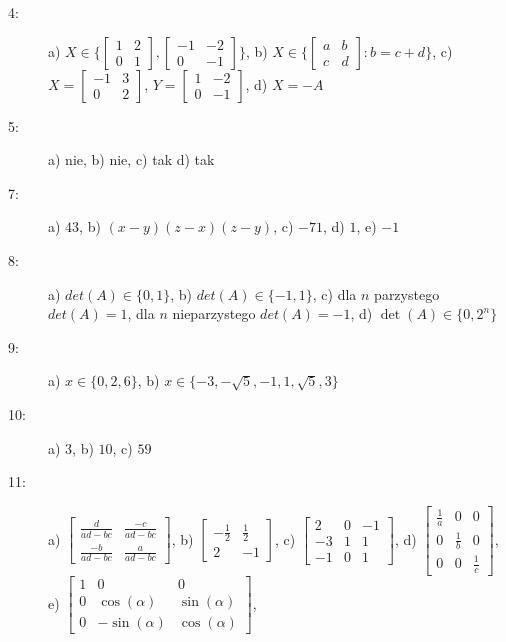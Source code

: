 \documentclass{article}
\begin{document}
\begin{description}
    \item [4:] a) $X \in \{ \begin{bmatrix} 1 & 2\\ 0 & 1 \end{bmatrix}, \begin{bmatrix} -1 & -2\\ 0 & -1 \end{bmatrix} \}$,
               b) $X \in \{ \begin{bmatrix} a & b\\ c & d \end{bmatrix}: b = c+d \}$,
               c) $X = \begin{bmatrix} -1 & 3\\ 0 & 2 \end{bmatrix} $, $Y = \begin{bmatrix} 1 & -2\\ 0 & -1 \end{bmatrix} $,
               d) $X = -A$
    \item [5:] a) nie, b) nie, c) tak d) tak
    \item [7:] a) $43$, b) $(x-y)(z-x)(z-y)$, c) $-71$, d) $1$, e) $-1$
    \item [8:] a) $det(A) \in \{ 0, 1 \}$, b) $det(A) \in \{ -1, 1 \}$, c) dla $n$ parzystego $det(A) = 1$, dla $n$ nieparzystego $det(A) = -1$, d) $\det(A) \in \{ 0, 2^{n} \}$
    \item [9:] a) $x \in \{ 0, 2, 6 \}$, b) $x \in \{ -3, -\sqrt{5}, -1, 1, \sqrt{5}, 3 \}$
    \item [10:] a) $3$, b) $10$, c) $59$
    \item [11:] a) $\begin{bmatrix} \frac{d}{ad-bc} & \frac{-c}{ad-bc}\\ \frac{-b}{ad-bc} & \frac{a}{ad-bc} \end{bmatrix} $,
               b) $\begin{bmatrix} -\frac{1}{2} & \frac{1}{2}\\ 2 & -1 \end{bmatrix} $,
               c) $\begin{bmatrix} 2 & 0 & -1\\ -3 & 1 & 1\\ -1 & 0 & 1 \end{bmatrix} $,
               d) $\begin{bmatrix} \frac{1}{a} & 0 & 0\\ 0 & \frac{1}{b} & 0\\ 0 & 0 & \frac{1}{c} \end{bmatrix} $,
               e) $\begin{bmatrix} 1 & 0 & 0\\ 0 & \cos(\alpha) & \sin(\alpha)\\ 0 & -\sin(\alpha) & \cos(\alpha) \end{bmatrix} $,
\end{description}
\end{document}
